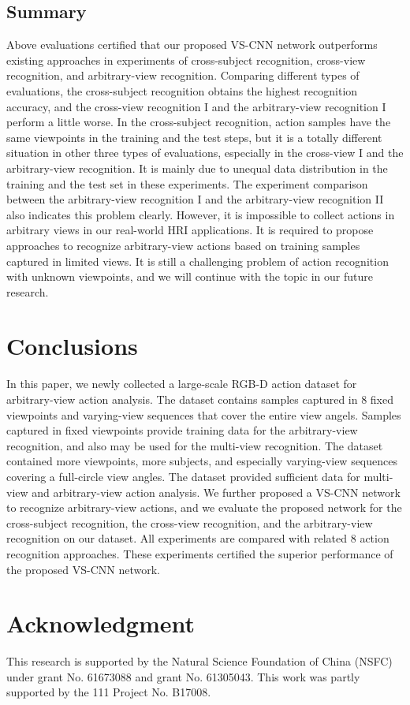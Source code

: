 \documentclass[journal]{IEEEtran}
\begin{document}
\subsection{Summary}
Above evaluations certified that our proposed VS-CNN network outperforms existing approaches in experiments of cross-subject recognition, cross-view recognition, and arbitrary-view recognition.
Comparing different types of evaluations, the cross-subject recognition obtains the highest recognition accuracy, and the cross-view recognition I and the arbitrary-view recognition I perform a little worse. In the cross-subject recognition, action samples have the same viewpoints in the training and the test steps, but it is a totally different situation in other three types of evaluations, especially in the cross-view I and the arbitrary-view recognition. It is mainly due to unequal data distribution in the training and the test set in these experiments. The experiment comparison between the arbitrary-view recognition I and the arbitrary-view recognition II also indicates this problem clearly. However, it is impossible to collect actions in arbitrary views in our real-world HRI applications. It is required to propose approaches to recognize arbitrary-view actions based on training samples captured in limited views.
It is still a challenging problem of action recognition with unknown viewpoints, and we will continue with the topic in our future research.

\section{Conclusions}
\label{sec:conclu}
In this paper, we newly collected a large-scale RGB-D action dataset for arbitrary-view action analysis. The dataset contains samples captured in 8 fixed viewpoints and varying-view sequences that cover the entire  view angels. Samples captured in fixed viewpoints provide training data for the arbitrary-view recognition, and also may be used for the multi-view recognition. The dataset contained more viewpoints, more subjects, and especially varying-view sequences covering a full-circle  view angles.
The dataset provided sufficient data for multi-view and arbitrary-view action analysis. We further proposed a VS-CNN network to recognize arbitrary-view actions, and we evaluate the proposed network for the cross-subject recognition, the cross-view recognition, and the arbitrary-view recognition on our dataset. All experiments are compared with related 8 action recognition approaches. These experiments certified the superior performance of the proposed VS-CNN network.

\section*{Acknowledgment}
This research is supported by the Natural Science Foundation of China (NSFC) under grant No. 61673088 and grant No. 61305043.
This work was partly supported by the 111 Project No. B17008.
\ifCLASSOPTIONcaptionsoff
  \newpage
\fi





\end{document}
